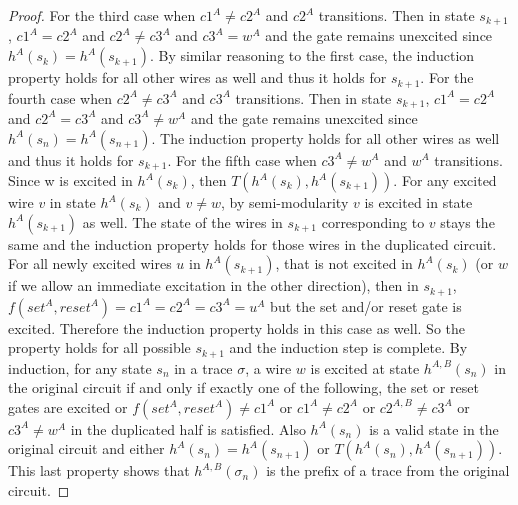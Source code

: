 \documentclass{article}
\begin{document}
\begin{proof}
\newline
For the third case when $c1^{A}\neq c2^{A}$ and $c2^A$ transitions.  Then in state $s_{k+1}$, $c1^A=c2^A$ and $c2^{A}\neq c3^{A}$ and $c3^{A}=w^A$ and the gate remains unexcited since $h^A(s_k)=h^A(s_{k+1})$.  By similar reasoning to the first case, the induction property holds for all other wires as well and thus it holds for $s_{k+1}$. \newline
For the fourth case when $c2^A \neq c3^A$ and $c3^A$ transitions.   Then in state $s_{k+1}$, $c1^A=c2^A$ and $c2^{A}= c3^{A}$ and $c3^{A}\neq w^A$ and the gate remains unexcited since $h^A(s_n)=h^A(s_{n+1})$.  The induction property holds for all other wires as well and thus it holds for $s_{k+1}$. \newline
For the fifth case when $c3^A\neq w^A$ and $w^A$ transitions.  Since w is excited in $h^A(s_k)$, then $T(h^A(s_k), h^A(s_{k+1}))$.  For any excited wire $v$ in state $h^A(s_k)$ and $v\neq w$, by semi-modularity $v$ is excited in state $h^A(s_{k+1})$ as well.  The state of the wires in $s_{k+1}$ corresponding to $v$ stays the same and the induction property holds for those wires in the duplicated circuit.  For all newly excited wires $u$ in $h^A(s_{k+1})$, that is not excited in $h^A(s_k)$ (or $w$ if we allow an immediate excitation in the other direction), then in $s_{k+1}$, $f(set^A, reset^A)=c1^A=c2^A=c3^A=u^A$ but the set and/or reset gate is excited.  Therefore the induction property holds in this case as well.  So the property holds for all possible $s_{k+1}$ and the induction step is complete. \newline
By induction, for any state $s_n$ in a trace $\sigma$, a wire $w$ is excited at state $h^{A,B}(s_n)$ in the original circuit if and only if exactly one of the following, the set or reset gates are excited or $f(set^A, reset^A) \neq c1^A$ or $c1^{A}\neq c2^{A}$ or $c2^{A,B}\neq c3^{A}$ or $c3^{A} \neq w^A$ in the duplicated half is satisfied.  Also $h^A(s_n)$ is a valid state in the original circuit and either $h^A(s_n)=h^A(s_{n+1})$ or $T(h^A(s_n), h^A(s_{n+1}))$.  This last property shows that $h^{A,B}(\sigma_n)$ is the prefix of a trace from the original circuit.


\end{proof}
\end{document}
